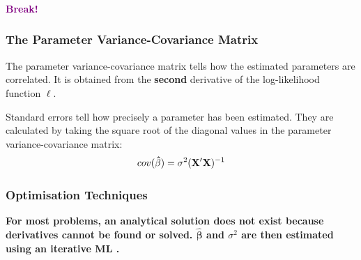 \documentclass{beamer}
\newenvironment{VerbatimIN}
 {\VerbatimEnvironment
  \begin{tcolorbox}[
    breakable,
    colback=lightgray,
    spartan
  ]%
  \begin{Verbatim}}
 {\end{Verbatim}\end{tcolorbox}}
\newenvironment{VerbatimOUT}
 {\VerbatimEnvironment
  \begin{tcolorbox}[
    breakable,
    spartan
  ]%
  \begin{Verbatim}}
 {\end{Verbatim}\end{tcolorbox}}
\begin{document}
\begin{frame}
    \frametitle{}
    \begin{center}
        \huge\textbf{\textcolor{purple}{Break!}}
    \end{center}
\end{frame}

\begin{frame}
    \frametitle{The Parameter Variance-Covariance Matrix}
    The parameter variance-covariance matrix tells how the estimated parameters are correlated. It is obtained from the \textbf{second} derivative of the log-likelihood function $\ell$.

    \vspace{0.5cm}
    Standard errors tell how precisely a parameter has been estimated. They are calculated by taking the square root of the diagonal values in the parameter variance-covariance matrix:
    \begin{equation*}
        \scriptsize{cov(\mathbf{\hat{\beta}})=\sigma^2 (\mathbf{X}' \mathbf{X})^{-1}}
    \end{equation*}
\end{frame}


\begin{frame}
    \frametitle{Optimisation Techniques}
    \textbf{For most problems, an analytical solution does not exist because derivatives cannot be found or solved. $\mathbf{\hat{\beta}}$ and $\sigma^2$ are then estimated using an iterative ML \color{blue}{optimisation procedure}.}
\end{frame}
\end{document}
